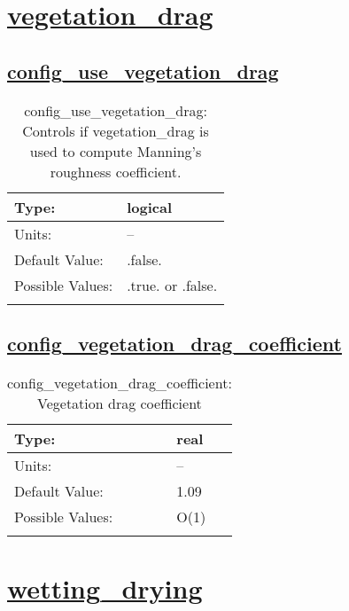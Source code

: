 \section[vegetation\_drag]{\hyperref[sec:nm_tab_vegetation_drag]{vegetation\_drag}}
\label{sec:nm_sec_vegetation_drag}
\subsection[config\_use\_vegetation\_drag]{\hyperref[sec:nm_tab_vegetation_drag]{config\_use\_vegetation\_drag}}
\label{subsec:nm_sec_config_use_vegetation_drag}
\begin{center}
\begin{longtable}{| p{2.0in} || p{4.0in} |}
    \hline
    Type: & logical \\
    \hline
    Units: & -- \\
    \hline
    Default Value: & .false. \\
    \hline
    Possible Values: & .true. or .false. \\
    \hline
    \caption{config\_use\_vegetation\_drag: Controls if vegetation\_drag is used to compute Manning's roughness coefficient.}
\end{longtable}
\end{center}
\subsection[config\_vegetation\_drag\_coefficient]{\hyperref[sec:nm_tab_vegetation_drag]{config\_vegetation\_drag\_coefficient}}
\label{subsec:nm_sec_config_vegetation_drag_coefficient}
\begin{center}
\begin{longtable}{| p{2.0in} || p{4.0in} |}
    \hline
    Type: & real \\
    \hline
    Units: & -- \\
    \hline
    Default Value: & 1.09 \\
    \hline
    Possible Values: & O(1) \\
    \hline
    \caption{config\_vegetation\_drag\_coefficient: Vegetation drag coefficient}
\end{longtable}
\end{center}
\section[wetting\_drying]{\hyperref[sec:nm_tab_wetting_drying]{wetting\_drying}}
\label{sec:nm_sec_wetting_drying}
